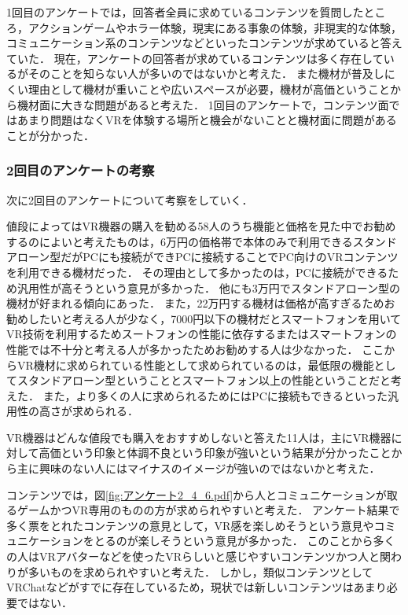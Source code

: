 \documentclass[12pt,a4j]{ltjsarticle}
\begin{document}
1回目のアンケートでは，回答者全員に求めているコンテンツを質問したところ，アクションゲームやホラー体験，現実にある事象の体験，非現実的な体験，コミュニケーション系のコンテンツなどといったコンテンツが求めていると答えていた．
現在，アンケートの回答者が求めているコンテンツは多く存在しているがそのことを知らない人が多いのではないかと考えた．
また機材が普及しにくい理由として機材が重いことや広いスペースが必要，機材が高価ということから機材面に大きな問題があると考えた．
1回目のアンケートで，コンテンツ面ではあまり問題はなくVRを体験する場所と機会がないことと機材面に問題があることが分かった．

\subsubsection{2回目のアンケートの考察}
次に2回目のアンケートについて考察をしていく．

値段によってはVR機器の購入を勧める58人のうち機能と価格を見た中でお勧めするのによいと考えたものは，6万円の価格帯で本体のみで利用できるスタンドアローン型だがPCにも接続ができPCに接続することでPC向けのVRコンテンツを利用できる機材だった．
その理由として多かったのは，PCに接続ができるため汎用性が高そうという意見が多かった．
他にも3万円でスタンドアローン型の機材が好まれる傾向にあった．
また，22万円する機材は価格が高すぎるためお勧めしたいと考える人が少なく，7000円以下の機材だとスマートフォンを用いてVR技術を利用するためスートフォンの性能に依存するまたはスマートフォンの性能では不十分と考える人が多かったためお勧めする人は少なかった．
ここからVR機材に求められている性能として求められているのは，最低限の機能としてスタンドアローン型ということとスマートフォン以上の性能ということだと考えた．
また，より多くの人に求められるためにはPCに接続もできるといった汎用性の高さが求められる．

VR機器はどんな値段でも購入をおすすめしないと答えた11人は，主にVR機器に対して高価という印象と体調不良という印象が強いという結果が分かったことから主に興味のない人にはマイナスのイメージが強いのではないかと考えた．

コンテンツでは，図\ref{fig:アンケート2_4_6.pdf}から人とコミュニケーションが取るゲームかつVR専用のものの方が求められやすいと考えた．
アンケート結果で多く票をとれたコンテンツの意見として，VR感を楽しめそうという意見やコミュニケーションをとるのが楽しそうという意見が多かった．
このことから多くの人はVRアバターなどを使ったVRらしいと感じやすいコンテンツかつ人と関わりが多いものを求められやすいと考えた．
しかし，類似コンテンツとしてVRChatなどがすでに存在しているため，現状では新しいコンテンツはあまり必要ではない．
\end{document}
